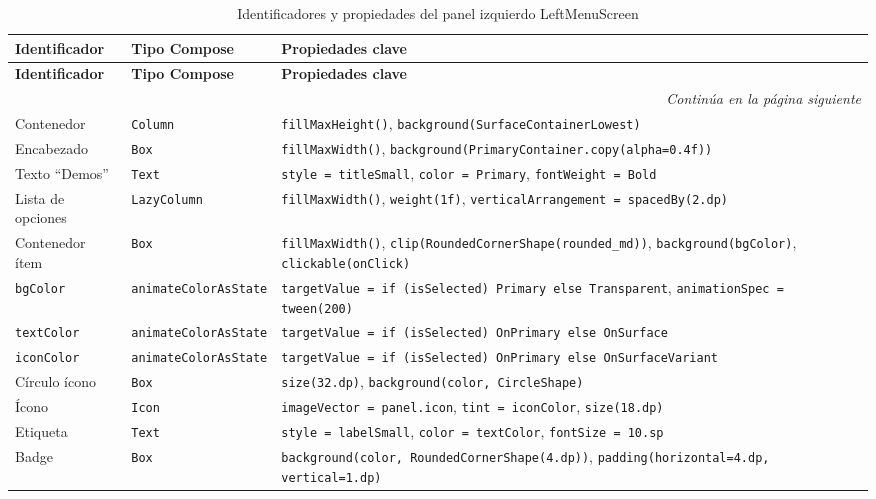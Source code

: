 \documentclass[stu, 12pt, letterpaper, donotrepeattitle, floatsintext, natbib]{apa7}
\begin{document}
\begin{longtable}{@{}p{2.5cm}p{4cm}p{9cm}@{}}
\caption{Identificadores y propiedades del panel izquierdo LeftMenuScreen}
\label{tab:idleftmenuscreen}\\
\toprule
\textbf{Identificador} & \textbf{Tipo Compose} & \textbf{Propiedades clave} \\
\midrule
\endfirsthead
\toprule
\textbf{Identificador} & \textbf{Tipo Compose} & \textbf{Propiedades clave} \\
\midrule
\endhead
\midrule
\multicolumn{3}{r}{\small\textit{Continúa en la página siguiente}}\\
\endfoot
\bottomrule
\endlastfoot
Contenedor & \texttt{Column} & \texttt{fillMaxHeight()}, \texttt{background(SurfaceContainerLowest)} \\[3pt]
Encabezado & \texttt{Box} & \texttt{fillMaxWidth()}, \texttt{background(PrimaryContainer.copy(alpha=0.4f))} \\[3pt]
Texto ``Demos'' & \texttt{Text} & \texttt{style = titleSmall}, \texttt{color = Primary}, \texttt{fontWeight = Bold} \\[3pt]
Lista de opciones & \texttt{LazyColumn} & \texttt{fillMaxWidth()}, \texttt{weight(1f)}, \texttt{verticalArrangement = spacedBy(2.dp)} \\[3pt]
Contenedor ítem & \texttt{Box} & \texttt{fillMaxWidth()}, \texttt{clip(RoundedCornerShape(rounded\_md))}, \texttt{background(bgColor)}, \texttt{clickable(onClick)} \\[3pt]
\texttt{bgColor} & \texttt{animateColorAsState} & \texttt{targetValue = if (isSelected) Primary else Transparent}, \texttt{animationSpec = tween(200)} \\[3pt]
\texttt{textColor} & \texttt{animateColorAsState} & \texttt{targetValue = if (isSelected) OnPrimary else OnSurface} \\[3pt]
\texttt{iconColor} & \texttt{animateColorAsState} & \texttt{targetValue = if (isSelected) OnPrimary else OnSurfaceVariant} \\[3pt]
Círculo ícono & \texttt{Box} & \texttt{size(32.dp)}, \texttt{background(color, CircleShape)} \\[3pt]
Ícono & \texttt{Icon} & \texttt{imageVector = panel.icon}, \texttt{tint = iconColor}, \texttt{size(18.dp)} \\[3pt]
Etiqueta & \texttt{Text} & \texttt{style = labelSmall}, \texttt{color = textColor}, \texttt{fontSize = 10.sp} \\[3pt]
Badge & \texttt{Box} & \texttt{background(color, RoundedCornerShape(4.dp))}, \texttt{padding(horizontal=4.dp, vertical=1.dp)} \\
\end{longtable}
\end{document}
